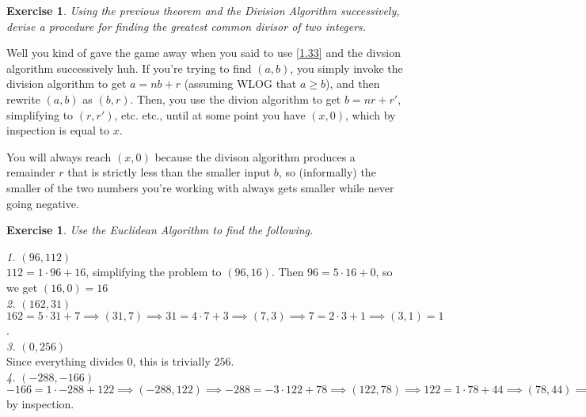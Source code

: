 \documentclass{article}
\newtheorem{ex}[thm]{Exercise}
\numberwithin{equation}{thm}
\begin{document}
\begin{ex} \label{1.35}
  Using the previous theorem and the Division Algorithm successively, devise a procedure for finding the greatest common divisor of two integers.
\end{ex}

Well you kind of gave the game away when you said to use \ref{1.33} and the divsion algorithm successively huh. If you're trying to find $(a, b)$, you simply invoke the division algorithm to get $a = nb + r$ (assuming WLOG that $a \geq b$), and then rewrite $(a, b)$ as $(b, r)$. Then, you use the divion algorithm to get $b = nr + r'$, simplifying to $(r, r')$, etc. etc., until at some point you have $(x, 0)$, which by inspection is equal to $x$.

You will always reach $(x, 0)$ because the divison algorithm produces a remainder $r$ that is strictly less than the smaller input $b$, so (informally) the smaller of the two numbers you're working with always gets smaller while never going negative.



\begin{ex} \label{1.36}
  Use the Euclidean Algorithm to find the following.
\end{ex}

\hspace*{5mm} \emph{1. $(96, 112)$} \\
\hspace*{15mm} $112 = 1 \cdot 96 + 16$, simplifying the problem to $(96, 16)$. Then $96 = 5 \cdot 16 + 0$, so we get $(16, 0) = 16$ \\

\hspace*{5mm} \emph{2. $(162, 31)$} \\
\hspace*{15mm} $162 = 5 \cdot 31 + 7 \implies (31, 7) \implies 31 = 4 \cdot 7 + 3 \implies (7, 3) \implies 7 = 2 \cdot 3 + 1 \implies (3, 1) = 1$. \\

\hspace*{5mm} \emph{3. $(0, 256)$} \\
\hspace*{15mm} Since everything divides $0$, this is trivially $256$. \\

\hspace*{5mm} \emph{4. $(-288,-166)$} \\
\hspace*{15mm} $-166 = 1 \cdot -288 + 122 \implies (-288, 122) \implies -288 = -3 \cdot 122 + 78 \implies (122, 78) \implies 122 = 1 \cdot 78 + 44 \implies (78, 44) \implies 78 = 1 \cdot 44 + 34 \implies (44, 34)
\implies 44 = 1 \cdot 34 + 10 \implies (34, 10) = 2$ by inspection.  \\
\end{document}
